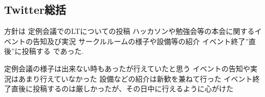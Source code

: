 \subsection*{Twitter総括}

方針は
    定例会議でのLTについての投稿
    ハッカソンや勉強会等の本会に関するイベントの告知及び実況
    サークルルームの様子や設備等の紹介
    イベント終了”直後”に投稿する
であった.

定例会議の様子は出来ない時もあったが行えていたと思う
イベントの告知や実況はあまり行えていなかった
設備などの紹介は新歓を兼ねて行った
イベント終了直後に投稿するのは厳しかったが、その日中に行えるように心がけた
